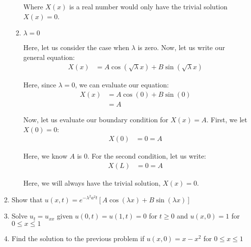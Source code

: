 \documentclass{article}
\begin{document}
\begin{enumerate}
\begin{enumerate}
  Where $X(x)$ is a real number would only have the trivial solution $X(x) = 0$.

  \item $\lambda = 0$

  Here, let us consider the case when $\lambda$ is zero. Now, let us write our general equation:
  \begin{align}
    X(x) & = A \cos(\sqrt \lambda x) + B \sin(\sqrt \lambda x)
  \end{align}

  Here, since $\lambda = 0$, we can evaluate our equation:
  \begin{align}
    X(x) & = A \cos(0) + B \sin(0)\\
    & = A
  \end{align}

  Now, let us evaluate our boundary condition for $X(x) = A$. First, we let $X(0) = 0$:
  \begin{align}
    X(0) & = 0 = A
  \end{align}

  Here, we know $A$ is $0$. For the second condition, let us write:
  \begin{align}
    X(L) & = 0 = A
  \end{align}

  Here, we will always have the trivial solution, $X(x) = 0$.

\end{enumerate}
%

  \item Show that $u(x, t) = e^{-\lambda^2 a^2 t}\left[ A \cos(\lambda x) + B \sin(\lambda x) \right]$
%



%
%
\newpage
%
%
  \item Solve $u_t = u_{xx}$ given $u(0, t) = u(1, t) = 0$ for $t \geq 0$ and $u(x, 0) = 1$ for $0 \leq x \leq 1$
%
%



%
%
  \item Find the solution to the previous problem if $u(x, 0) = x - x^2$ for $0 \leq x \leq 1$
%
%


\end{enumerate}
\end{document}
